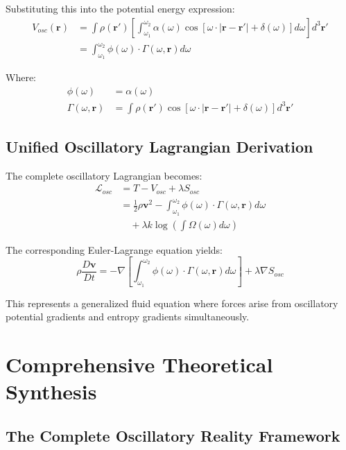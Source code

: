\documentclass[12pt,a4paper]{article}
\begin{document}
Substituting this into the potential energy expression:
\begin{align}
V_{osc}(\mathbf{r}) &= \int \rho(\mathbf{r}') \left[\int_{\omega_1}^{\omega_2} \alpha(\omega) \cos[\omega \cdot |\mathbf{r} - \mathbf{r}'| + \delta(\omega)] d\omega\right] d^3\mathbf{r}' \\
&= \int_{\omega_1}^{\omega_2} \phi(\omega) \cdot \Gamma(\omega, \mathbf{r}) d\omega
\end{align}

Where:
\begin{align}
\phi(\omega) &= \alpha(\omega) \\
\Gamma(\omega, \mathbf{r}) &= \int \rho(\mathbf{r}') \cos[\omega \cdot |\mathbf{r} - \mathbf{r}'| + \delta(\omega)] d^3\mathbf{r}'
\end{align}

\subsection{Unified Oscillatory Lagrangian Derivation}

The complete oscillatory Lagrangian becomes:
\begin{align}
\mathcal{L}_{osc} &= T - V_{osc} + \lambda S_{osc} \\
&= \frac{1}{2}\rho \mathbf{v}^2 - \int_{\omega_1}^{\omega_2} \phi(\omega) \cdot \Gamma(\omega, \mathbf{r}) d\omega \\
&\quad + \lambda k \log \left(\int \Omega(\omega) d\omega\right)
\end{align}

The corresponding Euler-Lagrange equation yields:
\begin{equation}
\rho \frac{D\mathbf{v}}{Dt} = -\nabla \left[\int_{\omega_1}^{\omega_2} \phi(\omega) \cdot \Gamma(\omega, \mathbf{r}) d\omega\right] + \lambda \nabla S_{osc}
\end{equation}

This represents a generalized fluid equation where forces arise from oscillatory potential gradients and entropy gradients simultaneously.

\section{Comprehensive Theoretical Synthesis}

\subsection{The Complete Oscillatory Reality Framework}
\end{document}
